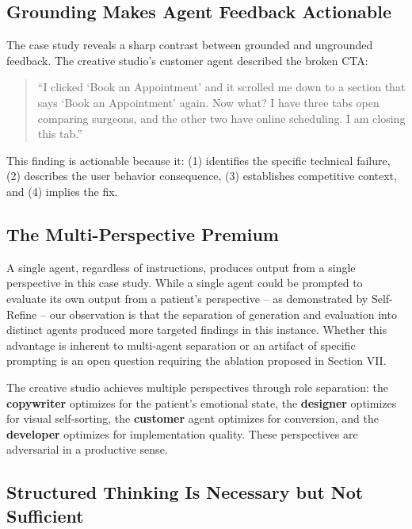 \documentclass[conference]{IEEEtran}
\begin{document}
\subsection{Grounding Makes Agent Feedback Actionable}\label{grounding-makes-agent-feedback-actionable}

The case study reveals a sharp contrast between grounded and ungrounded feedback. The creative studio's customer agent described the broken CTA:

\begin{quote}
``I clicked `Book an Appointment' and it scrolled me down to a section that says `Book an Appointment' again. Now what? I have three tabs open comparing surgeons, and the other two have online scheduling. I am closing this tab.''
\end{quote}

This finding is actionable because it: (1) identifies the specific technical failure, (2) describes the user behavior consequence, (3) establishes competitive context, and (4) implies the fix.

\subsection{The Multi-Perspective Premium}\label{the-multi-perspective-premium}

A single agent, regardless of instructions, produces output from a single perspective in this case study. While a single agent could be prompted to evaluate its own output from a patient's perspective -- as demonstrated by Self-Refine \cite{madaan2023selfrefine} -- our observation is that the separation of generation and evaluation into distinct agents produced more targeted findings in this instance. Whether this advantage is inherent to multi-agent separation or an artifact of specific prompting is an open question requiring the ablation proposed in Section VII.

The creative studio achieves multiple perspectives through role separation: the \textbf{copywriter} optimizes for the patient's emotional state, the \textbf{designer} optimizes for visual self-sorting, the \textbf{customer} agent optimizes for conversion, and the \textbf{developer} optimizes for implementation quality. These perspectives are adversarial in a productive sense.

\subsection{Structured Thinking Is Necessary but Not Sufficient}\label{structured-thinking-is-necessary-but-not-sufficient}
\end{document}
